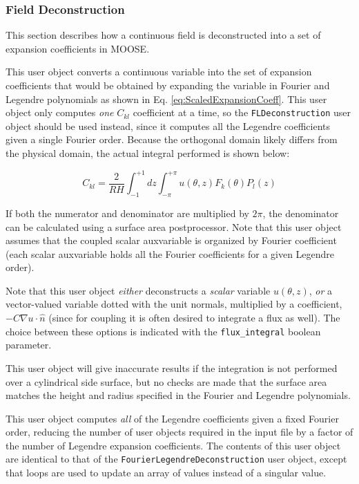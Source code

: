 \documentclass[10pt]{article}
\newcommand{\beq}{\begin{equation}}
\newcommand{\eeq}{\end{equation}}
\newcounter{subsubsubsection}[subsubsection]
\numberwithin{equation}{section} %
\begin{document}
\subsubsection{Field Deconstruction}
This section describes how a continuous field is deconstructed into a set of expansion coefficients in MOOSE.

This user object converts a continuous variable into the set of expansion coefficients that would be obtained by expanding the variable in Fourier and Legendre polynomials as shown in Eq. \eqref{eq:ScaledExpansionCoeff}. This user object only computes {\it one} \(C_{kl}\) coefficient at a time, so the {\tt FLDeconstruction} user object should be used instead, since it computes all the Legendre coefficients given a single Fourier order. Because the orthogonal domain likely differs from the physical domain, the actual integral performed is shown below:

\beq
C_{kl}=\frac{2}{RH}\int_{-1}^{+1}dz\int_{-\pi}^{+\pi}u(\theta, z)F_k(\theta)P_l(z)
\eeq

If both the numerator and denominator are multiplied by \(2\pi\), the denominator can be calculated using a surface area postprocessor. Note that this user object assumes that the coupled scalar auxvariable is organized by Fourier coefficient (each scalar auxvariable holds all the Fourier coefficients for a given Legendre order). 

Note that this user object {\it either} deconstructs a {\it scalar} variable \(u(\theta, z)\), {\it or} a vector-valued variable dotted with the unit normals, multiplied by a coefficient, \(-C\nabla u\cdot\hat{n}\) (since for coupling it is often desired to integrate a flux as well). The choice between these options is indicated with the {\tt flux\_integral} boolean parameter.

\color{magenta}
This user object will give inaccurate results if the integration is not performed over a cylindrical side surface, but no checks are made that the surface area matches the height and radius specified in the Fourier and Legendre polynomials.
\color{black}

This user object computes {\it all} of the Legendre coefficients given a fixed Fourier order, reducing the number of user objects required in the input file by a factor of the number of Legendre expansion coefficients. The contents of this user object are identical to that of the {\tt FourierLegendreDeconstruction} user object, except that loops are used to update an array of values instead of a singular value.
\end{document}
